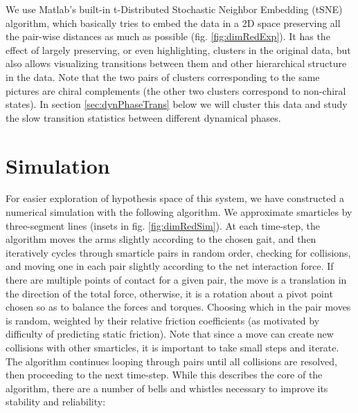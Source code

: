 \documentclass[11pt]{article}
\renewcommand{\=}[1]{\stackrel{#1}{=}} %
\renewcommand{\(}{\left (}
\renewcommand{\)}{\right  )}
\renewcommand{\[}{\left [}
\renewcommand{\]}{\right ]}
\newcommand{\<}{\left <}
\renewcommand{\>}{\right >}
\theoremstyle{definition}
\theoremstyle{remark}
\begin{document}
We use Matlab's built-in t-Distributed Stochastic Neighbor Embedding (tSNE) algorithm, which basically tries to embed the data in a 2D space preserving all the pair-wise distances as much as possible (fig. \ref{fig:dimRedExp}). It has the effect of largely preserving, or even highlighting, clusters in the original data, but also allows visualizing transitions between them and other hierarchical structure in the data. Note that the two pairs of clusters corresponding to the same pictures are chiral complements (the other two clusters correspond to non-chiral states). In section \ref{sec:dynPhaseTrans} below we will cluster this data and study the slow transition statistics between different dynamical phases.

\section{Simulation} \label{app:simulation}
For easier exploration of hypothesis space of this system, we have constructed a numerical simulation with the following algorithm. We approximate smarticles by three-segment lines (insets in fig. \ref{fig:dimRedSim}). At each time-step, the algorithm moves the arms slightly according to the chosen gait, and then iteratively cycles through smarticle pairs in random order, checking for collisions, and moving one in each pair slightly according to the net interaction force. If there are multiple points of contact for a given pair, the move is a translation in the direction of the total force, otherwise, it is a rotation about a pivot point chosen so as to balance the forces and torques. Choosing which in the pair moves is random, weighted by their relative friction coefficients (as motivated by difficulty of predicting static friction). Note that since a move can create new collisions with other smarticles, it is important to take small steps and iterate. The algorithm continues looping through pairs until all collisions are resolved, then proceeding to the next time-step. While this describes the core of the algorithm, there are a number of bells and whistles necessary to improve its stability and reliability:
\end{document}

